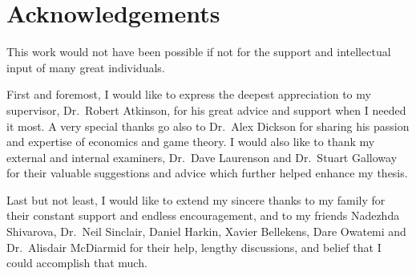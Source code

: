 \chapter*{Acknowledgements} %
\label{cha:acknowledgements}

This work would not have been possible if not for the support and intellectual input of many great individuals.

First and foremost, I would like to express the deepest appreciation to my supervisor, Dr.~Robert Atkinson, for his great advice and support when I needed it most. A very special thanks go also to Dr.~Alex Dickson for sharing his passion and expertise of economics and game theory. I would also like to thank my external and internal examiners, Dr.~Dave Laurenson and Dr.~Stuart Galloway for their valuable suggestions and advice which further helped enhance my thesis.

Last but not least, I would like to extend my sincere thanks to my family for their constant support and endless encouragement, and to my friends Nadezhda Shivarova, Dr.~Neil Sinclair, Daniel Harkin, Xavier Bellekens, Dare Owatemi and Dr.~Alisdair McDiarmid for their help, lengthy discussions, and belief that I could accomplish that much.

